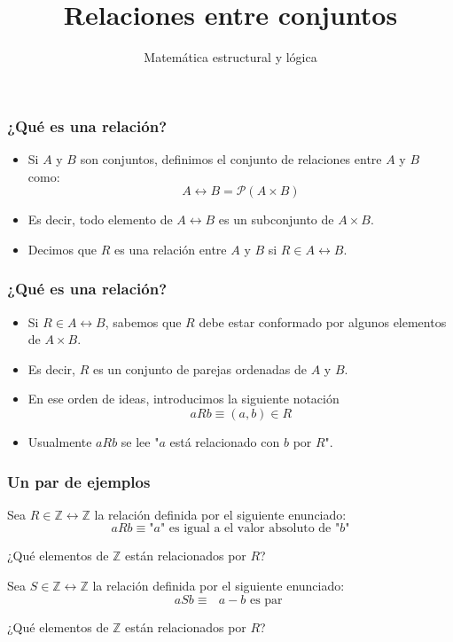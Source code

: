 \documentclass{beamer}
\title{Relaciones entre conjuntos}
\author{Matemática estructural y lógica}
\institute{ISIS-1104}
\date{}
\begin{document}
\frame{\titlepage}

\begin{frame}[fragile]
    \frametitle{¿Qué es una relación?}
    \begin{itemize}
        \item Si $A$ y $B$ son conjuntos, definimos el conjunto de relaciones entre $A$ y $B$ como:
    $$A \leftrightarrow B = \mathcal{P}(A \times B)$$
\item Es decir, todo elemento de $A \leftrightarrow B$ es un subconjunto de $A \times B$.
\item Decimos que $R$ es una relación entre $A$ y $B$ si $R \in A \leftrightarrow B$.
    \end{itemize}
\end{frame}

\begin{frame}[fragile]
    \frametitle{¿Qué es una relación?}
    \begin{itemize}
        \item Si $R \in A \leftrightarrow B$, sabemos que $R$ debe estar conformado por algunos elementos de $A \times B$. 
        \item Es decir, $R$ es un conjunto de parejas ordenadas de $A$ y $B$.
        \item En ese orden de ideas, introducimos la siguiente notación
            $$aRb \equiv (a, b) \in R$$
        \item Usualmente $aRb$ se lee "$a$ está relacionado con $b$ por $R$".
    \end{itemize}
\end{frame}

\begin{frame}[fragile]
    \frametitle{Un par de ejemplos}
    Sea $R \in \mathbb{Z} \leftrightarrow \mathbb{Z} $ la relación definida por el siguiente enunciado:
    $$aRb \equiv \text{"$a$" es igual a el valor absoluto de "$b$"}$$
    \begin{center}
        ¿Qué elementos de $ \mathbb{Z}$ están relacionados por $R$?
    \end{center}
    Sea $S \in \mathbb{Z} \leftrightarrow \mathbb{Z} $ la relación definida por el siguiente enunciado:
    $$aSb \equiv \text{ $a - b$ es par }$$
    \begin{center}
        ¿Qué elementos de $\mathbb{Z}$ están relacionados por $R$?
    \end{center}
\end{frame}
\end{document}
